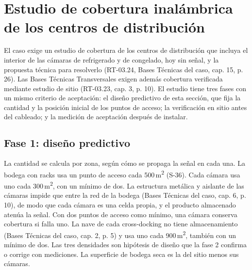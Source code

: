 \section{Estudio de cobertura inalámbrica de los centros de distribución}
\label{sec:anexo-4b-cobertura}
\label{fuente-16-anexo-4b-cobertura}

El caso exige un estudio de cobertura de los centros de distribución que incluya el interior de las cámaras de refrigerado y de congelado, hoy sin señal, y la propuesta técnica para resolverlo (RT-03.24, Bases Técnicas del caso, cap. 15, p. 26). Las Bases Técnicas Transversales exigen además cobertura verificada mediante estudio de sitio (RT-03.23, cap. 3, p. 10). El estudio tiene tres fases con un mismo criterio de aceptación: el diseño predictivo de esta sección, que fija la cantidad y la posición inicial de los puntos de acceso; la verificación en sitio antes del cableado; y la medición de aceptación después de instalar.

\subsection*{Fase 1: diseño predictivo}

La cantidad se calcula por zona, según cómo se propaga la señal en cada una. La bodega con racks usa un punto de acceso cada 500\,m\textsuperscript{2} (S-36). Cada cámara usa uno cada 300\,m\textsuperscript{2}, con un mínimo de dos. La estructura metálica y aislante de las cámaras impide que entre la red de la bodega (Bases Técnicas del caso, cap. 6, p. 10), de modo que cada cámara es una celda propia, y el producto almacenado atenúa la señal. Con dos puntos de acceso como mínimo, una cámara conserva cobertura si falla uno. La nave de cada cross-docking no tiene almacenamiento (Bases Técnicas del caso, cap. 2, p. 5) y usa uno cada 900\,m\textsuperscript{2}, también con un mínimo de dos. Las tres densidades son hipótesis de diseño que la fase 2 confirma o corrige con mediciones. La superficie de bodega seca es la del sitio menos sus cámaras.

